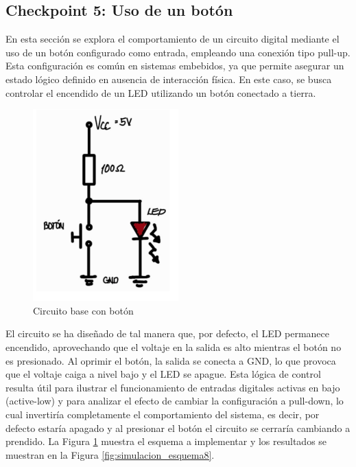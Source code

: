 \documentclass{article}
\begin{document}
\subsection{Checkpoint 5: Uso de un botón}
En esta sección se explora el comportamiento de un circuito digital mediante el uso de un botón configurado como entrada, empleando una conexión tipo pull-up. Esta configuración es común en sistemas embebidos, ya que permite asegurar un estado lógico definido en ausencia de interacción física. En este caso, se busca controlar el encendido de un LED utilizando un botón conectado a tierra.

\begin{figure}[H]
    \centering
    \includegraphics[width=0.50\textwidth]{./img/Circuito-boton.png}
    \caption{Circuito base con botón}
    \label{fig:simulacion_esquema7}
\end{figure}

El circuito se ha diseñado de tal manera que, por defecto, el LED permanece encendido, aprovechando que el voltaje en la salida es alto mientras el botón no es presionado. Al oprimir el botón, la salida se conecta a GND, lo que provoca que el voltaje caiga a nivel bajo y el LED se apague. Esta lógica de control resulta útil para ilustrar el funcionamiento de entradas digitales activas en bajo (active-low) y para analizar el efecto de cambiar la configuración a pull-down, lo cual invertiría completamente el comportamiento del sistema, es decir, por defecto estaría apagado y al presionar el botón el circuito se cerraría cambiando a prendido. La Figura \ref{fig:simulacion_esquema7} muestra el esquema a implementar y los resultados se muestran en la Figura \ref{fig:simulacion_esquema8}.
\end{document}
